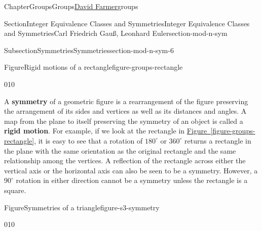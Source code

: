 \documentclass[oneside,10pt,]{book}
\newcommand{\xreffont}{\relax}
\newcommand{\terminology}[1]{\textbf{#1}}
\numberwithin{equation}{section}
\begin{document}
\begin{chapterptx}{Chapter}{Groups}{}{Groups}{\hyperlink{dfarmer}{David Farmer}}{}{groups}
\begin{sectionptx}{Section}{Integer Equivalence Classes and Symmetries}{}{Integer Equivalence Classes and Symmetries}{Carl Friedrich Gauß, Leonhard Euler}{}{section-mod-n-sym}
\begin{subsectionptx}{Subsection}{Symmetries}{}{Symmetries}{}{}{section-mod-n-sym-6}
\begin{figureptx}{Figure}{Rigid motions of a rectangle}{figure-groups-rectangle}{}
\begin{image}{0}{1}{0}{}
{\begin{tikzpicture}[scale=1.2]
\end{tikzpicture}%
}%
\end{image}%
\tcblower
\end{figureptx}%
A \terminology{symmetry} of a geometric figure is a rearrangement of the figure preserving the arrangement of its sides and vertices as well as its distances and angles.  A map from the plane to itself preserving the symmetry of an object is called a \terminology{rigid motion}.  For example, if we look at the rectangle in \hyperref[figure-groups-rectangle]{Figure~{\xreffont\ref{figure-groups-rectangle}}}, it is easy to see that a rotation of \(180^{\circ}\) or \(360^{\circ}\) returns a rectangle in the plane with the same orientation as the original rectangle and the same relationship among the vertices.  A reflection of the rectangle across either the vertical axis or the horizontal axis can also be seen to be a symmetry.  However, a \(90^{\circ}\) rotation in either direction cannot be a symmetry unless the rectangle is a square.%
\begin{figureptx}{Figure}{Symmetries of a triangle}{figure-s3-symmetry}{}%
\begin{image}{0}{1}{0}{}%
\end{image}
\end{figureptx}
\end{subsectionptx}
\end{sectionptx}
\end{chapterptx}
\end{document}
